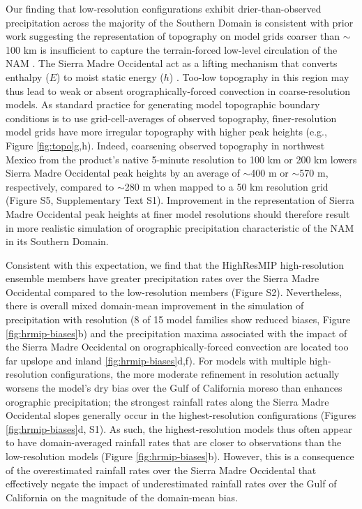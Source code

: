 \documentclass[draft]{agujournal2019}
\begin{document}
Our finding that low-resolution configurations exhibit drier-than-observed precipitation across the majority of the Southern Domain is consistent with prior work suggesting the representation of topography on model grids coarser than $\sim$100 km is insufficient to capture the terrain-forced low-level circulation of the NAM \cite{berbery03jc,pascale16jc,varuolo-clarke19jc}. The Sierra Madre Occidental act as a lifting mechanism that converts enthalpy ($E$) to moist static energy ($h$) \cite{varuolo-clarke19jc,boos21n}. Too-low topography in this region may thus lead to weak or absent orographically-forced convection in coarse-resolution models. As standard practice for generating model topographic boundary conditions is to use grid-cell-averages of observed topography, finer-resolution model grids have more irregular topography with higher peak heights (e.g., Figure \ref{fig:topo}g,h). Indeed, coarsening observed topography in northwest Mexico from the product's native 5-minute resolution to 100 km or 200 km lowers Sierra Madre Occidental peak heights by an average of $\sim$400 m or $\sim$570 m, respectively, compared to $\sim$280 m when mapped to a 50 km resolution grid (Figure S5, Supplementary Text S1). Improvement in the representation of Sierra Madre Occidental peak heights at finer model resolutions should therefore result in more realistic simulation of orographic precipitation characteristic of the NAM in its Southern Domain. 

Consistent with this expectation, we find that the HighResMIP high-resolution ensemble members have greater precipitation rates over the Sierra Madre Occidental compared to the low-resolution members (Figure S2). Nevertheless, there is overall mixed domain-mean improvement in the simulation of precipitation with resolution (8 of 15 model families show reduced biases, Figure \ref{fig:hrmip-biases}b) and the precipitation maxima associated with the impact of the Sierra Madre Occidental on orographically-forced convection are located too far upslope and inland \ref{fig:hrmip-biases}d,f). For models with multiple high-resolution configurations, the more moderate refinement in resolution actually worsens the model's dry bias over the Gulf of California moreso than enhances orographic precipitation; the strongest rainfall rates along the Sierra Madre Occidental slopes generally occur in the highest-resolution configurations (Figures \ref{fig:hrmip-biases}d, S1). As such, the highest-resolution models thus often appear to have domain-averaged rainfall rates that are closer to observations than the low-resolution models (Figure \ref{fig:hrmip-biases}b). However, this is a consequence of the overestimated rainfall rates over the Sierra Madre Occidental that effectively negate the impact of underestimated rainfall rates over the Gulf of California on the magnitude of the domain-mean bias. 
\end{document}

